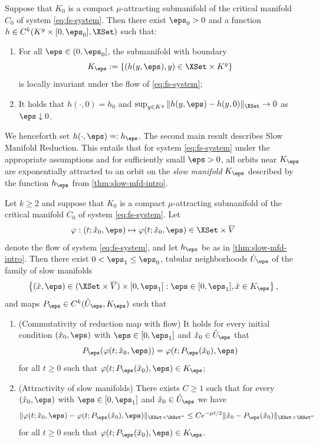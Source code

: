 \documentclass[a4paper]{siamart190516}
\begin{document}
 \begin{theorem}\label{thm:slow-mfd-intro}
Suppose that $K_0$ is a compact $\mu$-attracting submanifold of the critical manifold $C_0$ of system \cref{eq:fs-system}. 
Then there exist $\eps_0 > 0$ and a function $h \in C^k(K^y \times [0,\eps_0], \XSet)$  such that:
\begin{enumerate}
\item For all $\eps \in (0,\eps_0]$, the submanifold with boundary
\[
K_{\eps} := \{ (h(y,\eps),y) \in \XSet \times K^y \}
\]
is locally invariant under the flow of \cref{eq:fs-system};
\item It holds that $h(\cdot, 0) = h_0$ and $\sup_{y \in K^y} \| h(y,\eps) - h(y,0) \|_{\XSet} \rightarrow 0$ as $\eps \downarrow 0$.
\end{enumerate}
\end{theorem}

We henceforth set $h(\cdot,\eps) =: h_{\eps}$. The second main result
describes Slow Manifold Reduction. This entails that for system \cref{eq:fs-system}
under the appropriate assumptions and for sufficiently small $\eps > 0$, all orbits near $K_{\eps}$
are exponentially attracted to an orbit on the \textit{slow manifold} $K_{\eps}$ described by
the function $h_{\eps}$ from \cref{thm:slow-mfd-intro}. 

\begin{theorem}\label{thm:red-map-intro} 
Let $k \geq 2$ and suppose that $K_0$ is a compact $\mu$-attracting submanifold of the critical manifold
$C_0$ of system \cref{eq:fs-system}. 
Let 
\[
	\varphi: (t; \hat{x}_0,\eps) \mapsto \varphi(t;\hat{x}_0,\eps) \in \XSet \times \overline{V}
\]
denote the flow of system \cref{eq:fs-system}, and let $h_{\eps}$ be as in \cref{thm:slow-mfd-intro}. Then
there exist $0 < \eps_1 \leq \eps_0$, tubular neighborhoods $\hat{U}_{\eps}$ of the family of slow manifolds
\[
	\left\{ (\hat{x},\eps) \in (\XSet \times \overline{V}) \times [0,\eps_1] : \eps \in [0,\eps_1], \hat{x} \in K_{\eps} \right\},
\]
 and maps $P_{\eps} \in C^{k}(\hat{U}_{\eps}, K_{\eps})$ such that
\begin{enumerate}
\item(Commutativity of reduction map with flow) It holds for every initial condition 
$(\hat{x}_0, \eps)$ with $\eps \in [0,\eps_1]$ and $\hat{x}_0 \in \hat{U}_{\eps}$ that
\[
	P_{\eps}(\varphi(t; \hat{x}_0,\eps)) = \varphi(t; P_{\eps}(\hat{x}_0), \eps)
\]
for all $t \geq 0$ such that $\varphi(t; P_{\eps}(\hat{x}_0),\eps) \in K_{\eps}$;
\item(Attractivity of slow manifolds) There exists $C \geq 1$ such that  for every $(\hat{x}_0, \eps)$ with 
$\eps \in [0,\eps_1]$ and $\hat{x}_0 \in \hat{U}_{\eps}$  we have
\[
	\| \varphi(t; \hat{x}_0,\eps) - \varphi(t; P_{\eps}(\hat{x}_0), \eps)\|_{\XSet \times \RSet^n} \leq C e^{-\mu t/2} \|\hat{x}_0 - P_{\eps}(\hat{x}_0)\|_{\XSet \times \RSet^n}
\]
for all $t \geq 0$ such that $\varphi(t; P_{\eps}(\hat{x}_0),\eps) \in K_{\eps}$.
\end{enumerate}
\end{theorem}
\end{document}
